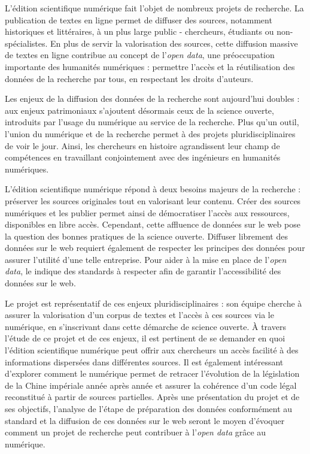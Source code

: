 L'édition scientifique numérique fait l'objet de nombreux projets de recherche. La publication de textes en ligne permet de diffuser des sources, notamment historiques et littéraires, à un plus large public - chercheurs, étudiants ou non-spécialistes. En plus de servir la valorisation des sources, cette diffusion massive de textes en ligne contribue au concept de l'\textit{open data}, une préoccupation importante des humanités numériques : permettre l'accès et la réutilisation des données de la recherche par tous, en respectant les droits d'auteurs. 

Les enjeux de la diffusion des données de la recherche sont aujourd'hui doubles : aux enjeux patrimoniaux s'ajoutent désormais ceux de la science ouverte, introduits par l'usage du numérique au service de la recherche. Plus qu'un outil, l'union du numérique et de la recherche permet à des projets pluridisciplinaires de voir le jour. Ainsi, les chercheurs en histoire agrandissent leur champ de compétences en travaillant conjointement avec des ingénieurs en humanités numériques. 

L'édition scientifique numérique répond à deux besoins majeurs de la recherche : préserver les sources originales tout en valorisant leur contenu. Créer des sources numériques et les publier permet ainsi de démocratiser l'accès aux ressources, disponibles en libre accès. Cependant, cette affluence de données sur le web pose la question des \og bonnes pratiques \fg de la science ouverte. Diffuser librement des données sur le web requiert également de respecter les principes \fair des données pour assurer l'utilité d'une telle entreprise. Pour aider à la mise en place de l'\textit{open data}, le \w indique des standards à respecter afin de garantir l'accessibilité des données sur le web. 

Le projet \COREL est représentatif de ces enjeux pluridisciplinaires : son équipe cherche à assurer la valorisation d'un corpus de textes et l'accès à ces sources via le numérique, en s'inscrivant dans cette démarche de science ouverte. À travers l'étude de ce projet et de ces enjeux, il est pertinent de se demander en quoi l’édition scientifique numérique peut offrir aux chercheurs un accès facilité à des informations dispersées dans différentes sources. Il est également intéressant d'explorer comment le numérique permet de retracer l’évolution de la législation de la Chine impériale année après année et assurer la cohérence d’un code légal reconstitué à partir de sources partielles. Après une présentation du projet et de ses objectifs, l'analyse de l'étape de préparation des données conformément au standard \TEI et la diffusion de ces données sur le web seront le moyen d'évoquer comment un projet de recherche peut contribuer à l'\textit{open data} grâce au numérique.
